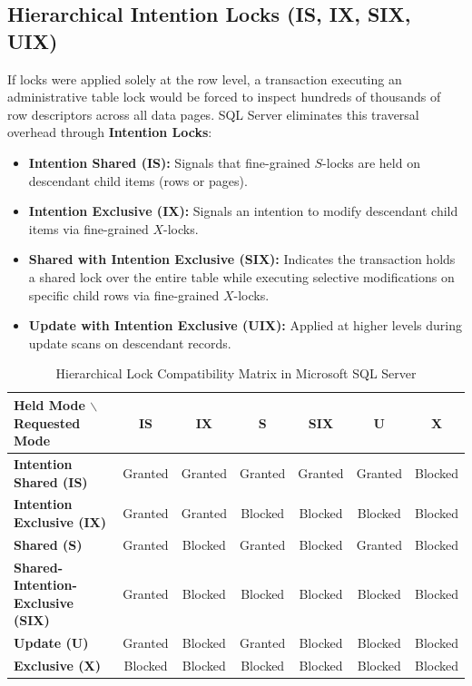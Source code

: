 \subsection{Hierarchical Intention Locks (IS, IX, SIX, UIX)}
If locks were applied solely at the row level, a transaction executing an administrative table lock would be forced to inspect hundreds of thousands of row descriptors across all data pages. SQL Server eliminates this traversal overhead through \textbf{Intention Locks}:
\begin{itemize}
    \item \textbf{Intention Shared (IS):} Signals that fine-grained $S$-locks are held on descendant child items (rows or pages).
    \item \textbf{Intention Exclusive (IX):} Signals an intention to modify descendant child items via fine-grained $X$-locks.
    \item \textbf{Shared with Intention Exclusive (SIX):} Indicates the transaction holds a shared lock over the entire table while executing selective modifications on specific child rows via fine-grained $X$-locks.
    \item \textbf{Update with Intention Exclusive (UIX):} Applied at higher levels during update scans on descendant records.
\end{itemize}

\begin{table}[H]
\centering
\small
\caption{Hierarchical Lock Compatibility Matrix in Microsoft SQL Server}
\label{tab:mssql_lock_compatibility}
\begin{tabularx}{\textwidth}{@{}lcccccc@{}}
\toprule
\textbf{Held Mode $\backslash$ Requested Mode} & \textbf{IS} & \textbf{IX} & \textbf{S} & \textbf{SIX} & \textbf{U} & \textbf{X} \\ \midrule
\textbf{Intention Shared (IS)} & Granted & Granted & Granted & Granted & Granted & Blocked \\
\textbf{Intention Exclusive (IX)} & Granted & Granted & Blocked & Blocked & Blocked & Blocked \\
\textbf{Shared (S)} & Granted & Blocked & Granted & Blocked & Granted & Blocked \\
\textbf{Shared-Intention-Exclusive (SIX)} & Granted & Blocked & Blocked & Blocked & Blocked & Blocked \\
\textbf{Update (U)} & Granted & Blocked & Granted & Blocked & Blocked & Blocked \\
\textbf{Exclusive (X)} & Blocked & Blocked & Blocked & Blocked & Blocked & Blocked \\ \bottomrule
\end{tabularx}
\end{table}

